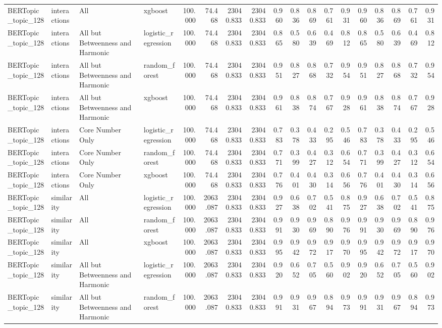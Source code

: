\begin{tabular}{llllrrrrrrrrrrrrrr}
BERTopic_topic_128 & interactions & All & xgboost & 100.000 & 74.468 & 23040.833 & 23040.833 & 0.960 & 0.836 & 0.869 & 0.761 & 0.931 & 0.960 & 0.836 & 0.869 & 0.761 & 0.931 \\
BERTopic_topic_128 & interactions & All but Betweenness and Harmonic & logistic_regression & 100.000 & 74.468 & 23040.833 & 23040.833 & 0.865 & 0.580 & 0.639 & 0.469 & 0.812 & 0.865 & 0.580 & 0.639 & 0.469 & 0.812 \\
BERTopic_topic_128 & interactions & All but Betweenness and Harmonic & random_forest & 100.000 & 74.468 & 23040.833 & 23040.833 & 0.951 & 0.827 & 0.868 & 0.732 & 0.954 & 0.951 & 0.827 & 0.868 & 0.732 & 0.954 \\
BERTopic_topic_128 & interactions & All but Betweenness and Harmonic & xgboost & 100.000 & 74.468 & 23040.833 & 23040.833 & 0.961 & 0.838 & 0.874 & 0.767 & 0.928 & 0.961 & 0.838 & 0.874 & 0.767 & 0.928 \\
BERTopic_topic_128 & interactions & Core Number Only & logistic_regression & 100.000 & 74.468 & 23040.833 & 23040.833 & 0.783 & 0.378 & 0.433 & 0.295 & 0.546 & 0.783 & 0.378 & 0.433 & 0.295 & 0.546 \\
BERTopic_topic_128 & interactions & Core Number Only & random_forest & 100.000 & 74.468 & 23040.833 & 23040.833 & 0.771 & 0.399 & 0.427 & 0.312 & 0.654 & 0.771 & 0.399 & 0.427 & 0.312 & 0.654 \\
BERTopic_topic_128 & interactions & Core Number Only & xgboost & 100.000 & 74.468 & 23040.833 & 23040.833 & 0.776 & 0.401 & 0.430 & 0.314 & 0.656 & 0.776 & 0.401 & 0.430 & 0.314 & 0.656 \\
BERTopic_topic_128 & similarity & All & logistic_regression & 100.000 & 2063.087 & 23040.833 & 23040.833 & 0.927 & 0.638 & 0.702 & 0.541 & 0.875 & 0.927 & 0.638 & 0.702 & 0.541 & 0.875 \\
BERTopic_topic_128 & similarity & All & random_forest & 100.000 & 2063.087 & 23040.833 & 23040.833 & 0.991 & 0.930 & 0.969 & 0.890 & 0.976 & 0.991 & 0.930 & 0.969 & 0.890 & 0.976 \\
BERTopic_topic_128 & similarity & All & xgboost & 100.000 & 2063.087 & 23040.833 & 23040.833 & 0.995 & 0.942 & 0.972 & 0.917 & 0.970 & 0.995 & 0.942 & 0.972 & 0.917 & 0.970 \\
BERTopic_topic_128 & similarity & All but Betweenness and Harmonic & logistic_regression & 100.000 & 2063.087 & 23040.833 & 23040.833 & 0.920 & 0.652 & 0.705 & 0.560 & 0.902 & 0.920 & 0.652 & 0.705 & 0.560 & 0.902 \\
BERTopic_topic_128 & similarity & All but Betweenness and Harmonic & random_forest & 100.000 & 2063.087 & 23040.833 & 23040.833 & 0.991 & 0.931 & 0.967 & 0.894 & 0.973 & 0.991 & 0.931 & 0.967 & 0.894 & 0.973 \\

\end{tabular}
